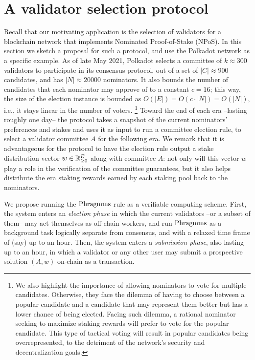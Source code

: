 \section{A validator selection protocol}\label{s:implement}

Recall that our motivating application is the selection of validators for a blockchain network that implements Nominated Proof-of-Stake (NPoS). 
In this section we sketch a proposal for such a protocol, and use the Polkadot network as a specific example.
As of late May 2021, Polkadot selects a committee of $k\approx 300$ validators to participate in its consensus protocol, out of a set of $|C|\approx 900$ candidates, and has $|N|\approx 20000$ nominators. 
It also bounds the number of candidates that each nominator may approve of to a constant $c=16$; 
this way, the size of the election instance is bounded as $O(|E|)=O(c\cdot |N|)=O(|N|)$, i.e., it stays linear in the number of voters.%
%
\footnote{We also highlight the importance of allowing nominators to vote for multiple candidates. 
Otherwise, they face the dilemma of having to choose between a popular candidate and a candidate that may represent them better but has a lower chance of being elected. Facing such dilemma, a rational nominator seeking to maximize staking rewards will prefer to vote for the popular candidate. This type of tactical voting will result in popular candidates being overrepresented, to the detriment of the network's security and decentralization goals.} 
%
Toward the end of each era --lasting roughly one day-- the protocol takes a snapshot of the current nominators' preferences and stakes and uses it as input to run a committee election rule, to select a validator committee $A$ for the following era. 
We remark that it is advantageous for the protocol to have the election rule output a stake distribution vector $w\in \mathbb{R}_{\geq 0}^E$ along with committee $A$: not only will this vector $w$ play a role in the verification of the committee guarantees, but it also helps distribute the era staking rewards earned by each staking pool back to the nominators.

We propose running the $\operatorname{Phragmms}$ rule as a verifiable computing scheme. 
First, the system enters an \emph{election phase} in which the current validators --or a subset of them-- may act themselves as off-chain workers, and run $\operatorname{Phragmms}$ as a background task logically separate from consensus, and with a relaxed time frame of (say) up to an hour. 
Then, the system enters a \emph{submission phase}, also lasting up to an hour, in which a validator or any other user may submit a prospective solution $(A,w)$ on-chain as a transaction. 

